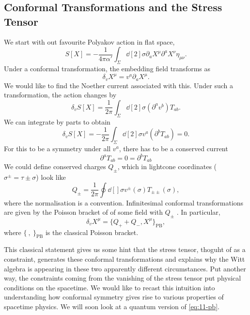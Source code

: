 \subsection{Conformal Transformations and the Stress Tensor}%
\label{sub:conformal_transformations_and_the_stress_tensor}

We start with out favourite Polyakov action in flat space,
\begin{equation}
  S[X] = -\frac{1}{4 \pi \alpha'} \int_\Sigma \dd[2]{\sigma} \partial_{a} X^{\mu} \partial^{a} X^{\nu} \eta_{\mu\nu}.
\end{equation}
Under a conformal transformation, the embedding field transforms as
\begin{equation}
  \delta_v X^{\mu} = v^{a} \partial_{a} X^{\mu}.
\end{equation}
We would like to find the Noether current associated with this.
Under such a transformation, the action changes by
\begin{equation}
  \delta_v S[X] = \frac{1}{2\pi} \int_\Sigma \dd[2]{\sigma} (\partial^{a} v^{b}) T_{ab}.
\end{equation}
We can integrate by parts to obtain
\begin{equation}
  \delta_v S[X] = -\frac{1}{2\pi} \int_\Sigma \dd[2]{\sigma} v^{a} (\partial^{b} T_{ab}) = 0.
\end{equation}
For this to be a symmetry under all $v^{a}$, there has to be a conserved current
\begin{equation}
  \label{eq:11-cons}
  \boxed{\partial^{a} T_{ab} = 0 = \partial^{b} T_{ab}}
\end{equation}
We could define conserved charges $Q_{\pm}$, which in lightcone coordinates ($\sigma^{\pm} = \tau \pm \sigma$) look like
\begin{equation}
  Q_{\pm} = \frac{1}{2\pi} \oint \dd[]{\sigma} v^{\pm}(\sigma) T_{\pm \pm} (\sigma),
\end{equation}
where the normalisation is a convention.
Infinitesimal conformal transformations are given by the Poisson bracket of of some field with $Q_{\pm}$ .
In particular, 
\begin{equation}
  \label{eq:11-pb}
  \delta_{v} X^{\mu} = \{ Q_{+} + Q_-, X^{\mu} \}_{\text{PB}},
\end{equation}
where $\{\ , \ \}_{\text{PB}}$  is the classical Poisson bracket.

This classical statement gives us some hint that the stress tensor, thoguht of as a constraint, generates these conformal transformations and explains why the Witt algebra is appearing in these two apparently different circumstances.
Put another way, the constraints coming from the vanishing of the stress tensor put physical conditions on the spacetime. We would like to recast this intuition into understanding how conformal symmetry gives rise to various properties of spacetime physics.
We will soon look at a quantum version of \eqref{eq:11-pb}.

